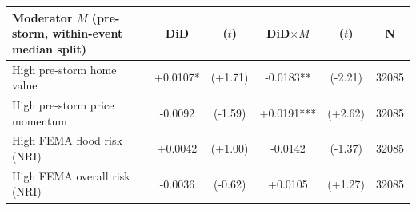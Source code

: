 \begin{tabular}{lccccc}
\toprule
Moderator $M$ (pre-storm, within-event median split) & DiD & ($t$) & DiD$\times M$ & ($t$) & N \\
\midrule
High pre-storm home value & +0.0107* & (+1.71) & -0.0183** & (-2.21) & 32085 \\
High pre-storm price momentum & -0.0092 & (-1.59) & +0.0191*** & (+2.62) & 32085 \\
High FEMA flood risk (NRI) & +0.0042 & (+1.00) & -0.0142 & (-1.37) & 32085 \\
High FEMA overall risk (NRI) & -0.0036 & (-0.62) & +0.0105 & (+1.27) & 32085 \\
\bottomrule
\end{tabular}